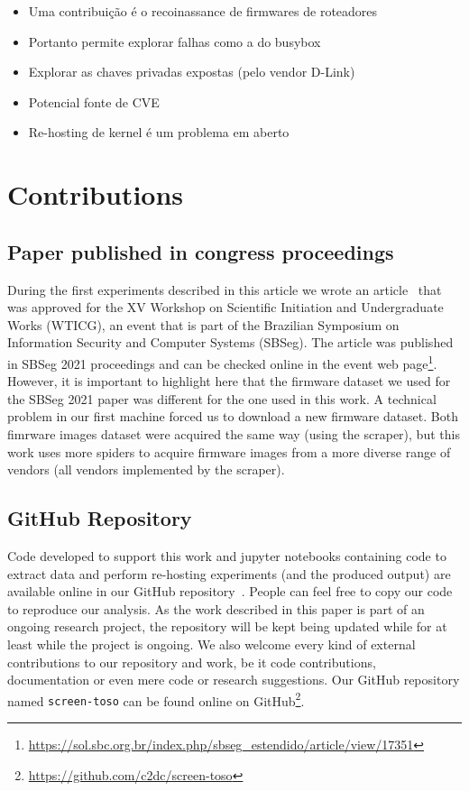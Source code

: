 \begin{itemize}

    \item Uma contribuição é o recoinassance de firmwares de roteadores
    \item Portanto permite explorar falhas como a do busybox
    \item Explorar as chaves privadas expostas (pelo vendor D-Link)
    \item Potencial fonte de CVE
    \item Re-hosting de kernel é um problema em aberto
    
\end{itemize}

\section{Contributions}

\subsection{Paper published in congress proceedings}
During the first experiments described in this article we wrote an article~\cite{sbseg2021} that was approved for the XV Workshop on Scientific Initiation and Undergraduate Works (WTICG), an event that is part of the Brazilian Symposium on Information Security and Computer Systems (SBSeg). The article was published in SBSeg 2021 proceedings and can be checked online in the event web page\footnote{\url{https://sol.sbc.org.br/index.php/sbseg_estendido/article/view/17351}}. However, it is important to highlight here that the firmware dataset we used for the SBSeg 2021 paper was different for the one used in this work. A technical problem in our first machine forced us to download a new firmware dataset. Both fimrware images dataset were acquired the same way (using the scraper), but this work uses more spiders to acquire firmware images from a more diverse range of vendors (all vendors implemented by the scraper).

\subsection{GitHub Repository}
Code developed to support this work and jupyter notebooks containing code to extract data and perform re-hosting experiments (and the produced output) are available online in our GitHub repository~\cite{github:c2dc-toso}. People can feel free to copy our code to reproduce our analysis. As the work described in this paper is part of an ongoing research project, the repository will be kept being updated while for at least while the project is ongoing. We also welcome every kind of external contributions to our repository and work, be it code contributions, documentation or even mere code or research suggestions. Our GitHub repository named {\tt screen-toso} can be found online on GitHub\footnote{\url{https://github.com/c2dc/screen-toso}}.

